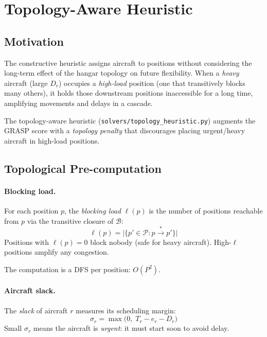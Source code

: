 \section{Topology-Aware Heuristic}
\label{sec:topology}

\subsection{Motivation}

The constructive heuristic assigns aircraft to positions without considering
the long-term effect of the hangar topology on future flexibility.  When a
\emph{heavy} aircraft (large $D_r$) occupies a \emph{high-load} position
(one that transitively blocks many others), it holds those downstream positions
inaccessible for a long time, amplifying movements and delays in a cascade.

The topology-aware heuristic (\texttt{solvers/topology\_heuristic.py}) augments
the GRASP score with a \emph{topology penalty} that discourages placing
urgent/heavy aircraft in high-load positions.

\subsection{Topological Pre-computation}

\paragraph{Blocking load.}
For each position $p$, the \emph{blocking load} $\ell(p)$ is the number of
positions reachable from $p$ via the transitive closure of $\mathcal{B}$:
\[
    \ell(p) = \bigl|\{p' \in \mathcal{P} : p \xrightarrow{*} p'\}\bigr|
\]
Positions with $\ell(p) = 0$ block nobody (safe for heavy aircraft).
High-$\ell$ positions amplify any congestion.

The computation is a DFS per position: $O(P^2)$.

\paragraph{Aircraft slack.}
The \emph{slack} of aircraft $r$ measures its scheduling margin:
\[
    \sigma_r = \max\bigl(0,\; T_r - e_r - D_r\bigr)
\]
Small $\sigma_r$ means the aircraft is \emph{urgent}: it must start soon to
avoid delay.

